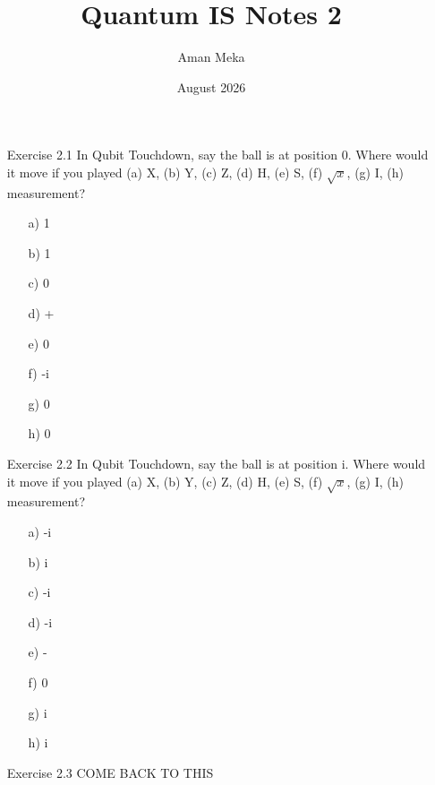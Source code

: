 \documentclass{article}
\title{Quantum IS Notes 2}
\author{Aman Meka}
\date{August 2026}
\begin{document}
\maketitle

\begin{enumerate}
    \item[Exercise 2.1] In Qubit Touchdown, say the ball is at position 0. Where would it move if you played (a) X, (b)  Y, (c) Z, (d) H, (e) S, (f) $\sqrt{x}$, (g) I, (h) measurement?
    \begin{enumerate}
        \item[a)] 1
        \item[b)] 1
        \item[c)] 0
        \item[d)] +
        \item[e)] 0
        \item[f)] -i
        \item[g)] 0
        \item[h)] 0
    \end{enumerate}

    \item[Exercise  2.2] In Qubit Touchdown, say the ball is at position i. Where would it move if you played (a) X, (b)  Y, (c) Z, (d) H, (e) S, (f) $\sqrt{x}$, (g) I, (h) measurement?
    \begin{enumerate}
        \item[a)] -i
        \item[b)] i
        \item[c)] -i
        \item[d)] -i
        \item[e)] -
        \item[f)] 0
        \item[g)] i
        \item[h)] i
    \end{enumerate}

    \item[Exercise 2.3] COME  BACK TO THIS
\end{enumerate}
\end{document}
